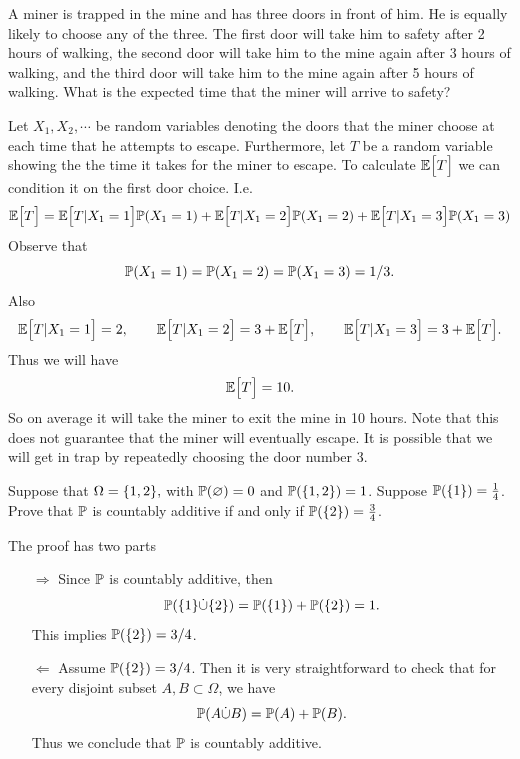 \begin{problem}
	A miner is trapped in the mine and has three doors in front of him. He is equally likely to choose any of the three. The first door will take him to safety after 2 hours of walking, the second door will take him to the mine again after 3 hours of walking, and the third door will take him to the mine again after 5 hours of walking. What is the expected time that the miner will arrive to safety?
\end{problem}
\begin{solution}
	Let $ X_1,X_2,\cdots $ be random variables denoting the doors that the miner choose at each time that he attempts to escape. Furthermore, let $ T $ be a random variable showing the the time it takes for the miner to escape. To calculate $ \mathbb{E}\big[T\big] $ we can condition it on the first door choice. I.e.
	\[ \mathbb{E}\big[T\big] = \mathbb{E}\big[T|X_1 =1\big]\mathbb{P}(X_1=1) + \mathbb{E}\big[T|X_1 =2\big]\mathbb{P}(X_1=2)+\mathbb{E}\big[T|X_1 =3\big]\mathbb{P}(X_1=3) \]
	Observe that 
	\[ \mathbb{P}(X_1=1) = \mathbb{P}(X_1=2) = \mathbb{P}(X_1=3) = 1/3. \]
	Also
	\[  \mathbb{E}\big[T|X_1 =1\big] = 2,\qquad  \mathbb{E}\big[T|X_1 =2\big] = 3+\mathbb{E}\big[T\big], \qquad \mathbb{E}\big[T|X_1 =3\big] = 3+\mathbb{E}\big[T\big]. \]
	Thus we will have
	\[ \mathbb{E}\big[T\big] = 10. \]
	So on average it will take the miner to exit the mine in 10 hours. Note that this does not guarantee that the miner will eventually escape. It is possible that we will get in trap by repeatedly choosing the door number 3.
\end{solution}

\begin{problem}
	Suppose that $ \Omega = \{1,2\}, $ with $ \mathbb{P}(\varnothing) = 0 $ and $ \mathbb{P}(\{1,2\}) = 1 $. Suppose $ \mathbb{P}(\{1\}) = \frac14 $. Prove that $ \mathbb{P} $ is countably additive if and only if $ \mathbb{P}(\{2\})=\frac34 $.
\end{problem}
\begin{solution}
	The proof has two parts
	\begin{itemize}
		\item [$ \boxed{\Longrightarrow} $] Since $ \mathbb{P} $ is countably additive, then 
		\[ \mathbb{P}(\{1\} \dot\cup \{2\}) = \mathbb{P}(\{1\}) + \mathbb{P}(\{2\}) = 1. \]
		This implies $ \mathbb{P}(\{2\}) = 3/4 $.
		\item [$ \boxed{\Longleftarrow} $] Assume $ \mathbb{P}(\{2\}) = 3/4 $. Then it is very straightforward to check that for every disjoint subset $ A,B \subset \Omega $, we have
		\[ \mathbb{P}(A \dot\cup B) = \mathbb{P}(A) + \mathbb{P}(B). \]
		Thus we conclude that $ \mathbb{P} $ is countably additive.
	\end{itemize}
\end{solution}

